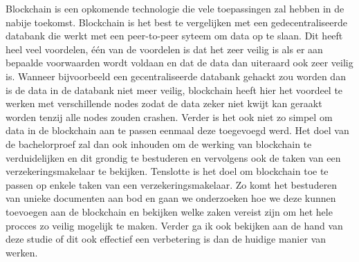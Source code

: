 Blockchain is een opkomende technologie die vele toepassingen zal hebben in de nabije toekomst. Blockchain is het best te vergelijken met een gedecentraliseerde databank die werkt met een peer-to-peer syteem om data op te slaan. Dit heeft heel veel voordelen, één van de voordelen is dat het zeer veilig is als er aan bepaalde voorwaarden wordt voldaan en dat de data dan uiteraard ook zeer veilig is. Wanneer bijvoorbeeld een gecentraliseerde databank gehackt zou worden dan is de data in de databank niet meer veilig, blockchain heeft hier het voordeel te werken met verschillende nodes zodat de data zeker niet kwijt kan geraakt worden tenzij alle nodes zouden crashen. Verder is het ook niet zo simpel om data in de blockchain aan te passen eenmaal deze toegevoegd werd. Het doel van de bachelorproef zal dan ook inhouden om de werking van blockchain te verduidelijken en dit grondig te bestuderen en vervolgens ook de taken van een verzekeringsmakelaar te bekijken. Tenslotte is het doel om blockchain toe te passen op enkele taken van een verzekeringsmakelaar. Zo komt het bestuderen van unieke documenten aan bod en gaan we onderzoeken hoe we deze kunnen toevoegen aan de blockchain en bekijken welke zaken vereist zijn om het hele procces zo veilig mogelijk te maken. Verder ga ik ook bekijken aan de hand van deze studie of dit ook effectief een verbetering is dan de huidige manier van werken.
